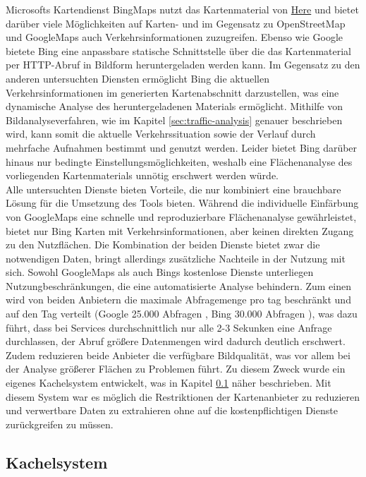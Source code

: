 Microsofts Kartendienst BingMaps nutzt das Kartenmaterial von \href{https://here.com/}{Here} und bietet darüber viele Möglichkeiten auf Karten- und im Gegensatz zu OpenStreetMap und GoogleMaps auch Verkehrsinformationen zuzugreifen. Ebenso wie Google bietete Bing eine anpassbare statische Schnittstelle \cite{bingstaticmap} über die das Kartenmaterial per HTTP-Abruf in Bildform heruntergeladen werden kann. Im Gegensatz zu den anderen untersuchten Diensten ermöglicht Bing die aktuellen Verkehrsinformationen im generierten Kartenabschnitt darzustellen, was eine dynamische Analyse des heruntergeladenen Materials ermöglicht. Mithilfe von Bildanalyseverfahren, wie im Kapitel \ref{sec:traffic-analysis} genauer beschrieben wird, kann somit die aktuelle Verkehrssituation sowie der Verlauf durch mehrfache Aufnahmen bestimmt und genutzt werden. Leider bietet Bing darüber hinaus nur bedingte Einstellungsmöglichkeiten, weshalb eine Flächenanalyse des vorliegenden Kartenmaterials unnötig erschwert werden würde.\\

Alle untersuchten Dienste bieten Vorteile, die nur kombiniert eine brauchbare Lösung für die Umsetzung des Tools bieten. Während die individuelle Einfärbung von GoogleMaps eine schnelle und reproduzierbare Flächenanalyse gewährleistet, bietet nur Bing Karten mit Verkehrsinformationen, aber keinen direkten Zugang zu den Nutzflächen. Die Kombination der beiden Dienste bietet zwar die notwendigen Daten, bringt allerdings zusätzliche Nachteile in der Nutzung mit sich. Sowohl GoogleMaps als auch Bings kostenlose Dienste unterliegen Nutzungbeschränkungen, die eine automatisierte Analyse behindern. Zum einen wird von beiden Anbietern die maximale Abfragemenge pro tag beschränkt und auf den Tag verteilt (Google 25.000 Abfragen \cite{googleusagelimits}, Bing 30.000 Abfragen \cite{bingusagelimits}), was dazu führt, dass bei Services durchschnittlich nur alle 2-3 Sekunken eine Anfrage durchlassen, der Abruf größere Datenmengen wird dadurch deutlich erschwert. Zudem reduzieren beide Anbieter die verfügbare Bildqualität, was vor allem bei der Analyse größerer Flächen zu Problemen führt. Zu diesem Zweck wurde ein eigenes Kachelsystem entwickelt, was in Kapitel \ref{sec:kachelsystem} näher beschrieben. Mit diesem System war es möglich die Restriktionen der Kartenanbieter zu reduzieren und verwertbare Daten zu extrahieren ohne auf die kostenpflichtigen Dienste zurückgreifen zu müssen.\\

\subsection{Kachelsystem}
\label{sec:kachelsystem}

